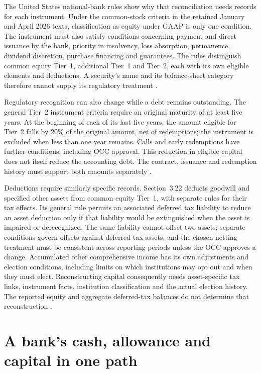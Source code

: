 The United States national-bank rules show why that reconciliation needs
records for each instrument. Under the common-stock criteria in the retained
January and April 2026 texts, classification as equity under GAAP is only one
condition. The instrument must also satisfy conditions concerning payment and
direct issuance by the bank, priority in insolvency, loss absorption, permanence,
dividend discretion, purchase financing and guarantees. The rules distinguish
common equity Tier~1, additional Tier~1 and Tier~2, each with its own eligible
elements and deductions. A security's name and its balance-sheet category
therefore cannot supply its regulatory treatment
\citep[12~CFR~3.20(a)--(d)]{occcapitaleligibility2026}.

Regulatory recognition can also change while a debt remains outstanding.
The general Tier~2 instrument criteria require an original maturity of at
least five years. At the beginning of each of its last five years, the amount
eligible for Tier~2 falls by 20\% of the original amount, net of redemptions;
the instrument is excluded when less than one year remains. Calls and early
redemptions have further conditions, including OCC approval. This reduction
in eligible capital does not itself reduce the accounting debt. The contract,
issuance and redemption history must support both amounts separately
\citep[12~CFR~3.20(d)(1), including footnote~7]{occcapitaleligibility2026}.

Deductions require similarly specific records. Section~3.22 deducts goodwill
and specified other assets from common equity Tier~1, with separate rules for
their tax effects. Its general rule permits an associated deferred tax
liability to reduce an asset deduction only if that liability would be
extinguished when the asset is impaired or derecognized. The same liability
cannot offset two assets; separate conditions govern offsets against deferred
tax assets, and the chosen netting treatment must be consistent across
reporting periods unless the OCC approves a change. Accumulated other
comprehensive income has its own adjustments and election conditions,
including limits on which institutions may opt out and when they must elect.
Reconstructing capital consequently needs asset-specific tax links, instrument
facts, institution classification and the actual election history. The reported
equity and aggregate deferred-tax balances do not determine that reconstruction
\citep[12~CFR~3.22(a), (b), (e)]{occcapitaldeductions2026}.


\section{A bank's cash, allowance and capital in one path}

